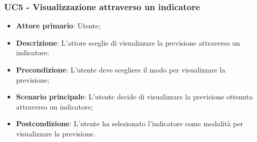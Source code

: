 \subsubsection{UC5 - Visualizzazione attraverso un indicatore}
\label{sssec:uc5}
\begin{itemize}
  \item \textbf{Attore primario}: Utente;
  \item \textbf{Descrizione}: L'attore sceglie di visualizzare la previsione attraverso un indicatore;
  \item \textbf{Precondizione}: L'utente deve scegliere il modo per visualizzare la previsione;
  \item \textbf{Scenario principale}: L'utente decide di visualizzare la previsione ottenuta attraverso un indicatore;
  \item \textbf{Postcondizione}: L'utente ha selezionato l'indicatore come modalità per visualizzare la previsione.
\end{itemize}

